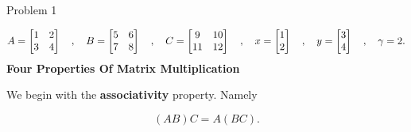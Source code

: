 \begin{problem}{Problem 1}
\begin{highlight}[Solution]
        \setcounter{equation}{0}
        \begin{equation}
            A = 
            \begin{bmatrix}
                1 & 2 \\
                3 & 4 \\
            \end{bmatrix}
            \hspace*{10pt} , \hspace*{10pt}
            B = 
            \begin{bmatrix}
                5 & 6 \\
                7 & 8 \\
            \end{bmatrix}
            \hspace*{10pt} , \hspace*{10pt}
            C = 
            \begin{bmatrix}
                9 & 10 \\
                11 & 12 \\
            \end{bmatrix}
            \hspace*{10pt} , \hspace*{10pt}
            x = 
            \begin{bmatrix}
                1 \\
                2 \\
            \end{bmatrix}
            \hspace*{10pt} , \hspace*{10pt}
            y = 
            \begin{bmatrix}
                3 \\
                4 \\
            \end{bmatrix}
            \hspace*{10pt} , \hspace*{10pt}
            \gamma = 2.
        \end{equation}
        \noindent \textbf{Four Properties Of Matrix Multiplication} \vspace*{1em}

        We begin with the \textbf{associativity} property. Namely

        \begin{equation}
            (AB)C = A(BC).
        \end{equation}


\end{highlight}
\end{problem}
